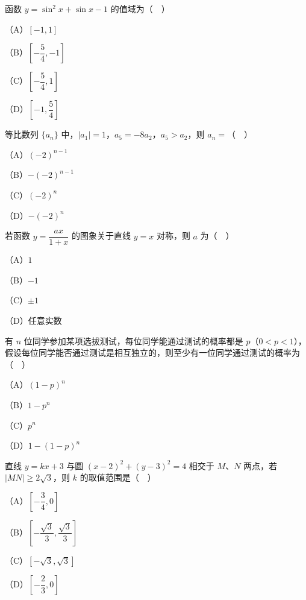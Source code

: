 \begin{question}
函数 $y=\sin^2x+\sin x-1$ 的值域为（　）

（A）$[-1,1]$

（B）$\left[-\dfrac54,-1\right]$

（C）$\left[-\dfrac54,1\right]$

（D）$\left[-1,\dfrac54\right]$

\end{question}
\begin{question}
等比数列 $\{a_n\}$ 中，$|a_1|=1$，$a_5=-8a_2$，$a_5>a_2$，则 $a_n=$（　）

（A）$(-2)^{n-1}$

（B）$-(-2)^{n-1}$

（C）$(-2)^n$

（D）$-(-2)^n$

\end{question}
\begin{question}
若函数 $y=\dfrac{ax}{1+x}$ 的图象关于直线 $y=x$ 对称，则 $a$ 为（　）

（A）$1$

（B）$-1$

（C）$\pm1$

（D）任意实数

\end{question}
\begin{question}
有 $n$ 位同学参加某项选拔测试，每位同学能通过测试的概率都是 $p$（$0<p<1$），假设每位同学能否通过测试是相互独立的，则至少有一位同学通过测试的概率为（　）

（A）$(1-p)^n$

（B）$1-p^n$

（C）$p^n$

（D）$1-(1-p)^n$

\end{question}
\begin{question}
直线 $y=kx+3$ 与圆 $(x-2)^2+(y-3)^2=4$ 相交于 $M$、$N$ 两点，若 $|MN|\geqslant2\sqrt3$，则 $k$ 的取值范围是（　）

（A）$\left[-\dfrac34,0\right]$

（B）$\left[-\dfrac{\sqrt3}3,\dfrac{\sqrt3}3\right]$

（C）$[-\sqrt3,\sqrt3]$

（D）$\left[-\dfrac23,0\right]$

\Needspace{0.4\textheight}
\end{question}
\begingroup
\renewenvironment{question}{\Needspace{0.5\textheight}}{}

